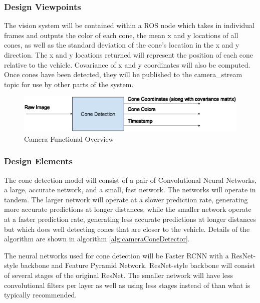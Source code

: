 \documentclass[10pt, onecolumn, draftclsnofoot, letterpaper,compsoc]{IEEEtran}
\begin{document}
\subsubsection{Design Viewpoints} %
The vision system will be contained within a ROS node which takes in individual frames and outputs the color of each cone, the mean x and y locations of all cones, as well as the standard deviation of the cone's location in the x and y direction. The x and y locations returned will represent the position of each cone relative to the vehicle. Covariance of x and y coordinates will also be computed. Once cones have been detected, they will be published to the camera\_stream topic for use by other parts of the system. 

\begin{figure}[htbp]
\centering
\label{fig:CameraInterfaceOverview}
\caption{Camera Functional Overview}
\includegraphics[width=15cm]{images/camera_cone_detection_interface}
\end{figure}

\subsubsection{Design Elements} %

The cone detection model will consist of a pair of Convolutional Neural Networks, a large, accurate network, and a small, fast network. The networks will operate in tandem. The larger network will operate at a slower prediction rate, generating more accurate predictions at longer distances, while the smaller network operate at a faster prediction rate, generating less accurate predictions at longer distances but which does well detecting cones that are closer to the vehicle. Details of the algorithm are shown in algorithm \ref{alg:cameraConeDetector}.

The neural networks used for cone detection will be Faster RCNN with a ResNet-style backbone and Feature Pyramid Network. ResNet-style backbone will consist of several stages of the original ResNet. The smaller network will have less convolutional filters per layer as well as using less stages instead of than what is typically recommended.
\end{document}
